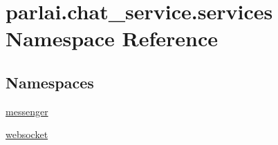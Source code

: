 \hypertarget{namespaceparlai_1_1chat__service_1_1services}{}\section{parlai.\+chat\+\_\+service.\+services Namespace Reference}
\label{namespaceparlai_1_1chat__service_1_1services}
\subsection*{Namespaces}
\begin{DoxyCompactItemize}
\item 
 \hyperlink{namespaceparlai_1_1chat__service_1_1services_1_1messenger}{messenger}
\item 
 \hyperlink{namespaceparlai_1_1chat__service_1_1services_1_1websocket}{websocket}
\end{DoxyCompactItemize}
